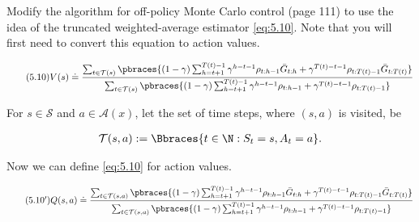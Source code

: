 
\begin{exercise}[Exercise 5.14]

Modify the algorithm for off-policy Monte Carlo control (page 111) to use the idea of the truncated weighted-average estimator \eqref{eq:5.10}.
Note that you will first need to convert this equation to action values.

\end{exercise}


\begin{solution}

\begin{align} \label{eq:5.10} \tag{5.10}
    V(s)
    \doteq
    \frac
    {
        \sum_{t \in \mathcal T(s)}
        \pbraces{
            (1 - \gamma)
            \sum_{h = t + 1}^{T(t) - 1}
                \gamma^{h-t-1}
                \rho_{t : h - 1}
                \bar G_{t:h}
            +
            \gamma^{T(t) - t - 1}
            \rho_{t : T(t) - 1}
            \bar G_{t : T(t)}
        }
    }{
        \sum_{t \in \mathcal T(s)}
        \pbraces{
            (1 - \gamma)
            \sum_{h = t + 1}^{T(t) - 1}
                \gamma^{h-t-1}
                \rho_{t : h - 1}
            +
            \gamma^{T(t) - t - 1}
            \rho_{t : T(t) - 1}
        }
    }
\end{align}

For $s \in \mathcal S$ and $a \in \mathcal A(x)$, let the set of time steps, where $(s, a)$ is visited, be

\begin{align*}
    \mathcal T(s, a)
    :=
    \Bbraces{t \in \N: S_t = s, A_t = a}.
\end{align*}

Now we can define \eqref{eq:5.10} for action values.

\begin{align} \label{eq:5.10'} \tag{5.10$^\prime$}
    Q(s, a)
    \doteq
    \frac
    {
        \sum_{t \in \mathcal T(s, a)}
        \pbraces{
            (1 - \gamma)
            \sum_{h = t + 1}^{T(t) - 1}
                \gamma^{h-t-1}
                \rho_{t : h - 1}
                \bar G_{t:h}
            +
            \gamma^{T(t) - t - 1}
            \rho_{t : T(t) - 1}
            \bar G_{t : T(t)}
        }
    }{
        \sum_{t \in \mathcal T(s, a)}
        \pbraces{
            (1 - \gamma)
            \sum_{h = t + 1}^{T(t) - 1}
                \gamma^{h-t-1}
                \rho_{t : h - 1}
            +
            \gamma^{T(t) - t - 1}
            \rho_{t : T(t) - 1}
        }
    }
\end{align}


\end{solution}
